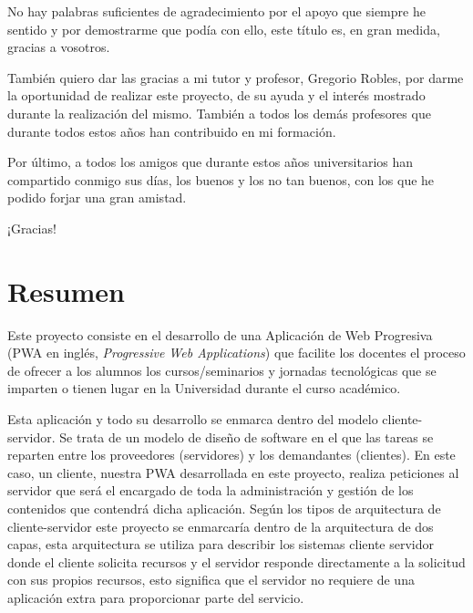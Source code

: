 \documentclass[a4paper, 12pt]{book}
\begin{document}
	No hay palabras suficientes de agradecimiento por el apoyo que siempre he sentido y por demostrarme que podía con ello, este título es, en gran medida, gracias a vosotros.

	También quiero dar las gracias a mi tutor y profesor, Gregorio Robles, por darme la oportunidad de realizar este proyecto, de su ayuda y el interés mostrado durante la realización del mismo.
También a todos los demás profesores que durante todos estos años han contribuido en mi formación.

	Por último, a todos los amigos que durante estos años universitarios han compartido conmigo sus días, los buenos y los no tan buenos, con los que he podido forjar una gran amistad.

	\vspace{5mm} %
	¡Gracias!



\chapter*{Resumen}

	Este proyecto consiste en el desarrollo de una Aplicación de Web Progresiva (PWA en inglés, \emph{Progressive Web Applications}) que facilite los docentes el proceso de ofrecer a los alumnos los cursos/seminarios y jornadas tecnológicas que se imparten o tienen lugar en la Universidad durante el curso académico.
	
	Esta aplicación y todo su desarrollo se enmarca dentro del modelo cliente-servidor. Se trata de un modelo de diseño de software en el que las tareas se reparten entre los proveedores (servidores) y los demandantes (clientes). En este caso, un cliente, nuestra PWA desarrollada en este proyecto, realiza peticiones al servidor que será el encargado de toda la administración y gestión de los contenidos que contendrá dicha aplicación. Según los tipos de arquitectura de cliente-servidor este proyecto se enmarcaría dentro de la arquitectura de dos capas, esta arquitectura se utiliza para describir los sistemas cliente servidor donde el cliente solicita recursos y el servidor responde directamente a la solicitud con sus propios recursos, esto significa que el servidor no requiere de una aplicación extra para proporcionar parte del servicio.
	
\end{document}
